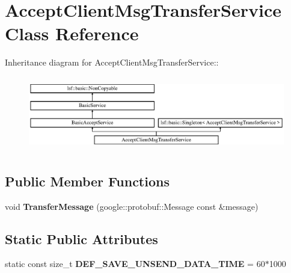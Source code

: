 \hypertarget{classAcceptClientMsgTransferService}{
\section{AcceptClientMsgTransferService Class Reference}
\label{classAcceptClientMsgTransferService}
}
Inheritance diagram for AcceptClientMsgTransferService::\begin{figure}[H]
\begin{center}
\leavevmode
\includegraphics[height=3.30383cm]{classAcceptClientMsgTransferService}
\end{center}
\end{figure}
\subsection*{Public Member Functions}
\begin{DoxyCompactItemize}
\item 
\hypertarget{classAcceptClientMsgTransferService_aa19eba44b524239f1563fd423ba4d40e}{
void {\bfseries TransferMessage} (google::protobuf::Message const \&message)}
\label{classAcceptClientMsgTransferService_aa19eba44b524239f1563fd423ba4d40e}

\end{DoxyCompactItemize}
\subsection*{Static Public Attributes}
\begin{DoxyCompactItemize}
\item 
\hypertarget{classAcceptClientMsgTransferService_a332615c6f5cbeacec8ba26d3b9ce03cf}{
static const size\_\-t {\bfseries DEF\_\-SAVE\_\-UNSEND\_\-DATA\_\-TIME} = 60$\ast$1000}
\label{classAcceptClientMsgTransferService_a332615c6f5cbeacec8ba26d3b9ce03cf}

\end{DoxyCompactItemize}
